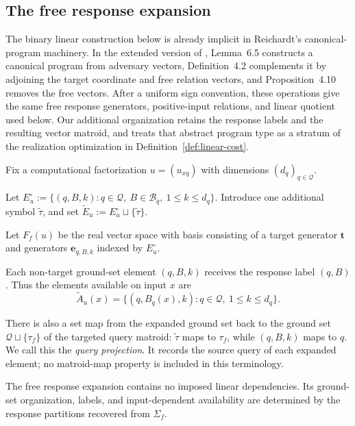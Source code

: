 \documentclass[11pt]{article}
\numberwithin{equation}{section}
\theoremstyle{remark}
\begin{document}
\subsection{The free response expansion}
\label{subsec:free-response-expansion}

The binary linear construction below is already implicit in
Reichardt's canonical-program machinery. In the extended version of
\cite{Reichardt2009}, Lemma~6.5 constructs a canonical program from adversary
vectors, Definition~4.2 complements it by adjoining the target coordinate and
free relation vectors, and Proposition~4.10 removes the free vectors. After a
uniform sign convention, these operations give the same free response
generators, positive-input relations, and linear quotient used below. Our
additional organization retains the response labels and the resulting vector
matroid, and treats that abstract program type as a stratum of the realization
optimization in Definition~\ref{def:linear-cost}.

Fix a computational factorization
$u=(u_{xq})$ with dimensions $(d_q)_{q\in\mathcal Q}$.

Let $E_u^\circ:=\{(q,B,k):q\in\mathcal Q,\ B\in\mathcal B_q,\ 1\leq k\leq d_q\}$.
Introduce one additional symbol $\widetilde\tau$, and set
$\widetilde E_u:=E_u^\circ\sqcup\{\widetilde\tau\}$.

Let $F_f(u)$ be the real vector space with basis consisting of a target
generator $\mathbf t$ and generators
$\mathbf e_{q,B,k}$ indexed by $E_u^\circ$.

Each non-target ground-set element $(q,B,k)$ receives the response label
$(q,B)$. Thus the elements available on input $x$ are
\begin{equation}
    \widetilde A_u(x)
    =
    \{
        (q,B_q(x),k):
        q\in\mathcal Q,\
        1\leq k\leq d_q
    \}.
\end{equation}

There is also a set map from the expanded ground set back to the
ground set $\mathcal Q\sqcup\{\tau_f\}$ of the targeted query matroid:
$\widetilde\tau$ maps to $\tau_f$, while $(q,B,k)$ maps to $q$. We call
this the \emph{query projection}. It records the source query of each
expanded element; no matroid-map property is included in this terminology.

The free response expansion contains no imposed linear dependencies.
Its ground-set organization, labels, and input-dependent availability are
determined by the response partitions recovered from $\Sigma_f$.
\end{document}
